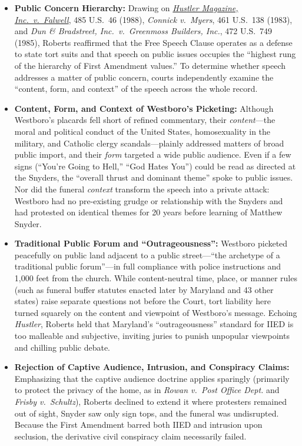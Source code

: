 \documentclass[12pt]{article}
\begin{document}
\begin{itemize}
  \item \textbf{Public Concern Hierarchy:} Drawing on \href{https://supreme.justia.com/cases/federal/us/485/46/}{\textit{Hustler Magazine, Inc.\ v.\ Falwell}}, 485 U.S.\ 46 (1988), \textit{Connick v.\ Myers}, 461 U.S.\ 138 (1983), and \textit{Dun \& Bradstreet, Inc.\ v.\ Greenmoss Builders, Inc.}, 472 U.S.\ 749 (1985), Roberts reaffirmed that the Free Speech Clause operates as a defense to state tort suits and that speech on public issues occupies the ``highest rung of the hierarchy of First Amendment values.'' To determine whether speech addresses a matter of public concern, courts independently examine the ``content, form, and context'' of the speech across the whole record.
  \item \textbf{Content, Form, and Context of Westboro's Picketing:} Although Westboro's placards fell short of refined commentary, their \textit{content}---the moral and political conduct of the United States, homosexuality in the military, and Catholic clergy scandals---plainly addressed matters of broad public import, and their \textit{form} targeted a wide public audience. Even if a few signs (``You're Going to Hell,'' ``God Hates You'') could be read as directed at the Snyders, the ``overall thrust and dominant theme'' spoke to public issues. Nor did the funeral \textit{context} transform the speech into a private attack: Westboro had no pre-existing grudge or relationship with the Snyders and had protested on identical themes for 20 years before learning of Matthew Snyder.
  \item \textbf{Traditional Public Forum and ``Outrageousness'':} Westboro picketed peacefully on public land adjacent to a public street---``the archetype of a traditional public forum''---in full compliance with police instructions and 1,000 feet from the church. While content-neutral time, place, or manner rules (such as funeral buffer statutes enacted later by Maryland and 43 other states) raise separate questions not before the Court, tort liability here turned squarely on the content and viewpoint of Westboro's message. Echoing \textit{Hustler}, Roberts held that Maryland's ``outrageousness'' standard for IIED is too malleable and subjective, inviting juries to punish unpopular viewpoints and chilling public debate.
  \item \textbf{Rejection of Captive Audience, Intrusion, and Conspiracy Claims:} Emphasizing that the captive audience doctrine applies sparingly (primarily to protect the privacy of the home, as in \textit{Rowan v.\ Post Office Dept.} and \textit{Frisby v.\ Schultz}), Roberts declined to extend it where protesters remained out of sight, Snyder saw only sign tops, and the funeral was undisrupted. Because the First Amendment barred both IIED and intrusion upon seclusion, the derivative civil conspiracy claim necessarily failed.
\end{itemize}
\end{document}
